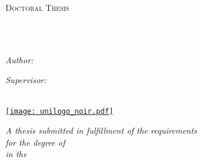 \documentclass[
11pt, %
english, %
singlespacing, %
headsepline, %
]{MastersDoctoralThesis} %
\author{Philipp S. \textsc{Sommer}} %
\begin{document}

\pagestyle{plain} %


\begin{titlepage}
\begin{center}

\vspace*{.06\textheight}
{\scshape\LARGE \univname\par}\vspace{1.5cm} %
\textsc{\Large Doctoral Thesis}\\[0.5cm] %

\HRule \\[0.4cm] %
{\huge \bfseries \ttitle\par}\vspace{0.4cm} %
\HRule \\[1.5cm] %

\begin{minipage}[t]{0.4\textwidth}
\begin{flushleft} \large
\emph{Author:}\\
\href{http://www.philipp-s-sommer.de}{\authorname} %
\end{flushleft}
\end{minipage}
\begin{minipage}[t]{0.4\textwidth}
\begin{flushright} \large
\emph{Supervisor:} \\
\href{https://wp.unil.ch/davisgroup/basil-davis}{\supname} %
\end{flushright}
\end{minipage}\\[1cm]

\href{https://www.unil.ch}{\texttt{[image: unilogo\_noir.pdf]}} \\[0.25cm] %

\vfill

\large \textit{A thesis submitted in fulfillment of the requirements\\ for the degree of \degreename}\\[0.3cm] %
\textit{in the}\\[0.4cm]
\groupname\\\deptname\\\facname\\[2cm] %


\end{center}
\end{titlepage}
\end{document}
